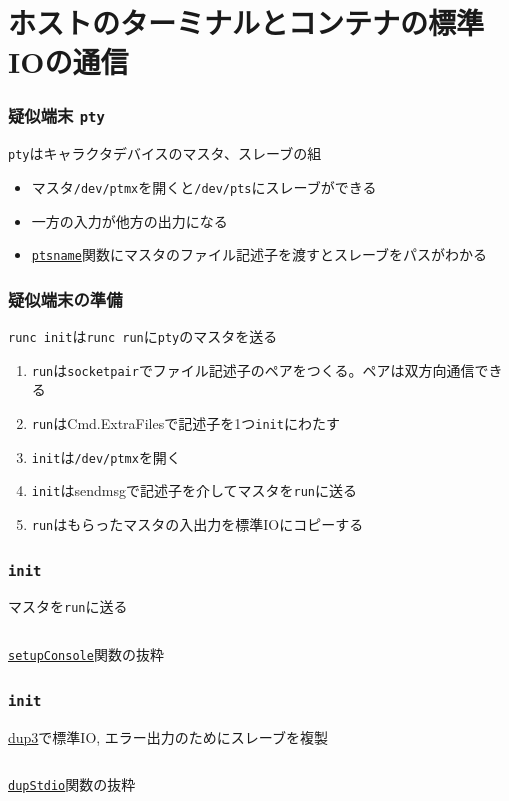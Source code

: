 \documentclass[unicode, 14pt, aspectratio=169]{beamer}
\begin{document}
\section{ホストのターミナルとコンテナの標準IOの通信}
\begin{frame}[t]
  \frametitle{疑似端末 \texttt{pty}}
  \texttt{pty}はキャラクタデバイスのマスタ、スレーブの組\supercite{pty}
  \begin{itemize}[leftmargin=0.8cm,label=$\circ$]
  \item マスタ\texttt{/dev/ptmx}を開くと\texttt{/dev/pts}にスレーブができる
  \item 一方の入力が他方の出力になる
  \item \href{https://man7.org/linux/man-pages/man3/ptsname.3.html}{\texttt{ptsname}}関数にマスタのファイル記述子を渡すとスレーブをパスがわかる
  \end{itemize}
\end{frame}
\begin{frame}[t]
  \frametitle{疑似端末の準備}
  \texttt{runc init}は\texttt{runc run}に\texttt{pty}のマスタを送る
  \begin{enumerate}[leftmargin=1.2cm]
  \item \texttt{run}は\texttt{socketpair}でファイル記述子のペアをつくる。ペアは双方向通信できる
  \item \texttt{run}はCmd.ExtraFilesで記述子を1つ\texttt{init}にわたす 
  \item \texttt{init}は\texttt{/dev/ptmx}を開く
  \item \texttt{init}はsendmsgで記述子を介してマスタを\texttt{run}に送る
  \item \texttt{run}はもらったマスタの入出力を標準IOにコピーする
  \end{enumerate}
\end{frame}
\begin{frame}[t]
  \frametitle{\texttt{init}}
  マスタを\texttt{run}に送る
  \begin{center}
    \inputminted{go}{code/tty_init.go}
    \href{https://github.com/opencontainers/runc/blob/7cb363254b69e10320360b63fb73e0ffb5da7bf2/libcontainer/init_linux.go\#L371}{\texttt{setupConsole}}関数の抜粋
  \end{center}
\end{frame}
\begin{frame}[t]
  \frametitle{\texttt{init}}
  \href{https://ja.manpages.org/dup3/2}{dup3}で標準IO, エラー出力のためにスレーブを複製
  \begin{center}
    \inputminted{go}{code/pty_init_dup.go}
    \href{https://github.com/opencontainers/runc/blob/7cb363254b69e10320360b63fb73e0ffb5da7bf2/libcontainer/console_linux.go\#L28}{\texttt{dupStdio}}関数の抜粋
  \end{center}
\end{frame}
\end{document}

